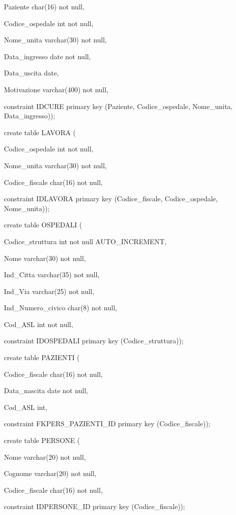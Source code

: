 \documentclass[a4paper,12pt]{report}
\begin{document}
     Paziente char(16) not null,

     Codice\_ospedale int not null,

     Nome\_unita varchar(30) not null,

     Data\_ingresso date not null,

     Data\_uscita date,

     Motivazione varchar(400) not null,

     constraint IDCURE primary key (Paziente, Codice\_ospedale, Nome\_unita, Data\_ingresso)); \newline

\noindent create table LAVORA (

     Codice\_ospedale int not null,

     Nome\_unita varchar(30) not null,

     Codice\_fiscale char(16) not null,

     constraint IDLAVORA primary key (Codice\_fiscale, Codice\_ospedale, Nome\_unita)); \newline

\noindent create table OSPEDALI (

     Codice\_struttura int not null AUTO\_INCREMENT,

     Nome varchar(30) not null,

     Ind\_Citta varchar(35) not null,

     Ind\_Via varchar(25) not null,

     Ind\_Numero\_civico char(8) not null,

     Cod\_ASL int not null,

     constraint IDOSPEDALI primary key (Codice\_struttura)); \newline

\noindent create table PAZIENTI (

     Codice\_fiscale char(16) not null,

     Data\_nascita date not null,

     Cod\_ASL int,

     constraint FKPERS\_PAZIENTI\_ID primary key (Codice\_fiscale)); \newline

\noindent create table PERSONE (

     Nome varchar(20) not null,

     Cognome varchar(20) not null,

     Codice\_fiscale char(16) not null,

     constraint IDPERSONE\_ID primary key (Codice\_fiscale)); \newline
\end{document}
